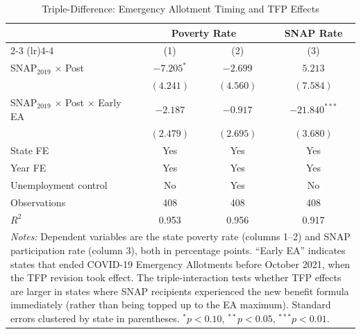 \begin{table}[htbp]
\centering
\caption{Triple-Difference: Emergency Allotment Timing and TFP Effects}
\label{tab:triple}
\begin{tabular}{lccc}
\hline\hline
 & \multicolumn{2}{c}{Poverty Rate} & SNAP Rate \\
\cmidrule(lr){2-3} \cmidrule(lr){4-4}
 & (1) & (2) & (3) \\
\hline
SNAP$_{2019}$ $\times$ Post & $-7.205^{*}$ & $-2.699$ & $5.213$ \\
 & $(4.241)$ & $(4.560)$ & $(7.584)$ \\
[6pt]
SNAP$_{2019}$ $\times$ Post $\times$ Early EA & $-2.187$ & $-0.917$ & $-21.840^{***}$ \\
 & $(2.479)$ & $(2.695)$ & $(3.680)$ \\
\hline
State FE & Yes & Yes & Yes \\
Year FE & Yes & Yes & Yes \\
Unemployment control & No & Yes & No \\
\hline
Observations & 408 & 408 & 408 \\
$R^2$ & 0.953 & 0.956 & 0.917 \\
\hline\hline
\multicolumn{4}{p{0.85\textwidth}}{\footnotesize \textit{Notes:} Dependent variables are the state poverty rate (columns 1--2) and SNAP participation rate (column 3), both in percentage points. ``Early EA'' indicates states that ended COVID-19 Emergency Allotments before October 2021, when the TFP revision took effect. The triple-interaction tests whether TFP effects are larger in states where SNAP recipients experienced the new benefit formula immediately (rather than being topped up to the EA maximum). Standard errors clustered by state in parentheses. $^{*}p<0.10$, $^{**}p<0.05$, $^{***}p<0.01$.} \\
\end{tabular}
\end{table}
